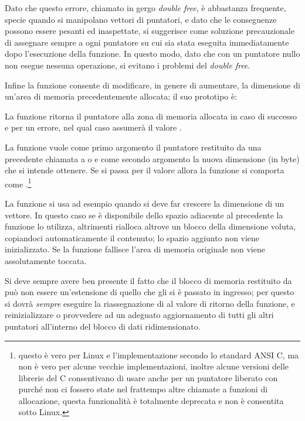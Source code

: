 Dato che questo errore, chiamato in gergo \textit{double free}, è abbastanza
frequente, specie quando si manipolano vettori di puntatori, e dato che le
conseguenze possono essere pesanti ed inaspettate, si suggerisce come
soluzione precauzionale di assegnare sempre a  ogni puntatore su cui
sia stata eseguita  immediatamente dopo l'esecuzione della
funzione. In questo modo, dato che con un puntatore nullo  non
esegue nessuna operazione, si evitano i problemi del \textit{double free}.


Infine la funzione  consente di modificare, in genere di
aumentare, la dimensione di un'area di memoria precedentemente allocata; il
suo prototipo è:

\begin{funcproto}{ 
}  {La funzione ritorna il puntatore alla zona di memoria allocata in caso
  di successo e  per un errore, nel qual caso 
  assumerà il valore .}
\end{funcproto}

La funzione vuole come primo argomento il puntatore restituito da una
precedente chiamata a  o  e come secondo argomento
la nuova dimensione (in byte) che si intende ottenere. Se si passa
per  il valore  allora la funzione si comporta come
.\footnote{questo è vero per Linux e l'implementazione secondo lo
  standard ANSI C, ma non è vero per alcune vecchie implementazioni, inoltre
  alcune versioni delle librerie del C consentivano di usare 
  anche per un puntatore liberato con  purché non ci fossero state
  nel frattempo altre chiamate a funzioni di allocazione, questa funzionalità
  è totalmente deprecata e non è consentita sotto Linux.}

La funzione si usa ad esempio quando si deve far crescere la dimensione di un
vettore. In questo caso se è disponibile dello spazio adiacente al precedente
la funzione lo utilizza, altrimenti rialloca altrove un blocco della
dimensione voluta, copiandoci automaticamente il contenuto; lo spazio aggiunto
non viene inizializzato. Se la funzione fallisce l'area di memoria originale
non viene assolutamente toccata.

Si deve sempre avere ben presente il fatto che il blocco di memoria restituito
da  può non essere un'estensione di quello che gli si è passato
in ingresso; per questo si dovrà \emph{sempre} eseguire la riassegnazione di
 al valore di ritorno della funzione, e reinizializzare o provvedere
ad un adeguato aggiornamento di tutti gli altri puntatori all'interno del
blocco di dati ridimensionato.

